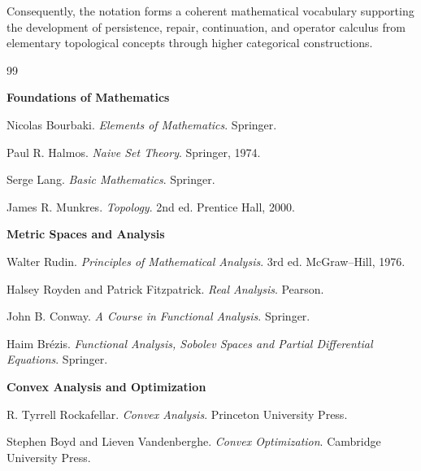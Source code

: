 \documentclass[11pt]{book}
\numberwithin{equation}{chapter}
\theoremstyle{definition}
\theoremstyle{plain}
\begin{document}
Consequently, the notation forms a coherent mathematical vocabulary
supporting the development of persistence, repair, continuation, and
operator calculus from elementary topological concepts through higher
categorical constructions.

\newpage

\begin{thebibliography}{99}

\newcommand{\bibheading}[1]{%
  \vspace{1.2em}%
  \item[]\hspace*{-\leftmargin}\textbf{\large #1}%
  \vspace{0.4em}%
}

\bibheading{Foundations of Mathematics}

Nicolas Bourbaki.
\textit{Elements of Mathematics}.
Springer.

Paul R. Halmos.
\textit{Naive Set Theory}.
Springer, 1974.

Serge Lang.
\textit{Basic Mathematics}.
Springer.

James R. Munkres.
\textit{Topology}.
2nd ed.
Prentice Hall, 2000.

\bibheading{Metric Spaces and Analysis}

Walter Rudin.
\textit{Principles of Mathematical Analysis}.
3rd ed.
McGraw--Hill, 1976.

Halsey Royden and Patrick Fitzpatrick.
\textit{Real Analysis}.
Pearson.

John B. Conway.
\textit{A Course in Functional Analysis}.
Springer.

Haim Brézis.
\textit{Functional Analysis, Sobolev Spaces and Partial Differential Equations}.
Springer.

\bibheading{Convex Analysis and Optimization}

R. Tyrrell Rockafellar.
\textit{Convex Analysis}.
Princeton University Press.

Stephen Boyd and Lieven Vandenberghe.
\textit{Convex Optimization}.
Cambridge University Press.


\end{thebibliography}
\end{document}
